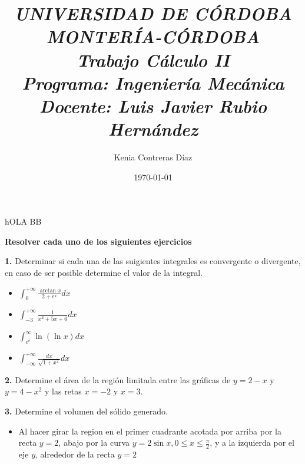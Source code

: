 \documentclass[12pt]{article}
\title{\textbf{\textit{\large{UNIVERSIDAD DE CÓRDOBA\\ MONTERÍA-CÓRDOBA\\ Trabajo Cálculo II\\ Programa: Ingeniería Mecánica\\Docente: Luis Javier Rubio Hernández\\}}}}
\author{Kenia Contreras Díaz}
\date{\today}
\begin{document}
hOLA BB
\maketitle
\thispagestyle{fancy}
\begin{flushleft}


\textbf{Resolver cada uno de los siguientes ejercicios}\\
\vspace{0.5cm}




\textbf{1.} Determinar si cada una de las suigientes integrales es convergente o divergente, en caso de ser posible determine el valor de la integral.
\vspace{0.5cm}


\begin{multicols}{2}
\begin{itemize}


\Large \item $\int_{0}^{+\infty }\frac{\arctan x}{2+e^{x}}dx$



\Large\item $\int_{-3}^{+\infty }\frac{1}{x^{2}+5x+6}dx$

\columnbreak


\large\item $\int_{e^{e}}^{\infty }\ln\left ( \ln x \right )dx$



\large\item $\int_{-\infty}^{+\infty }\frac{dx}{\sqrt{1+x^{4}}}dx$

\end{itemize}
\end{multicols}
\vspace{0.5cm}


\textbf{2.} Determine el área de la región limitada entre las gráficas de $y=2-x$ y $y=4-x^{2}$ y las retas $x=-2$ y $x=3$.
\vspace{0.5cm}



\textbf{3.} Determine el volumen del sólido generado. 


\begin{itemize}


    \item Al hacer girar la region en el primer cuadrante acotada por arriba por la recta $y=2$, abajo por la curva $y=2\sin{x},0\leq x\leq \frac{\pi}{2}$, y a la izquierda por el eje $y$, alrededor de la recta $y=2$



\end{itemize}
\end{flushleft}
\end{document}
